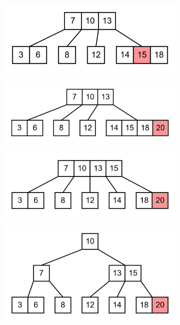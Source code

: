 \documentclass[11pt,a4paper]{article}
\begin{document}
\begin{loesung}
\begin{enumerate}
\begin{figure}[h!]
            \begin{subfigure}[b]{0.31\textwidth}
                \centering
                \includegraphics[scale=0.14]{img/3d/13}
            \end{subfigure}
            \begin{subfigure}[b]{0.31\textwidth}
                \centering
                \includegraphics[scale=0.14]{img/3d/14}
            \end{subfigure}
            \begin{subfigure}[b]{0.31\textwidth}
                \centering
                \includegraphics[scale=0.14]{img/3d/15}
            \end{subfigure}
            \begin{subfigure}[b]{0.31\textwidth}
                \centering
                \includegraphics[scale=0.14]{img/3d/16}
            \end{subfigure}
        \end{figure}
        \FloatBarrier


\end{enumerate}
\end{loesung}
\end{document}
